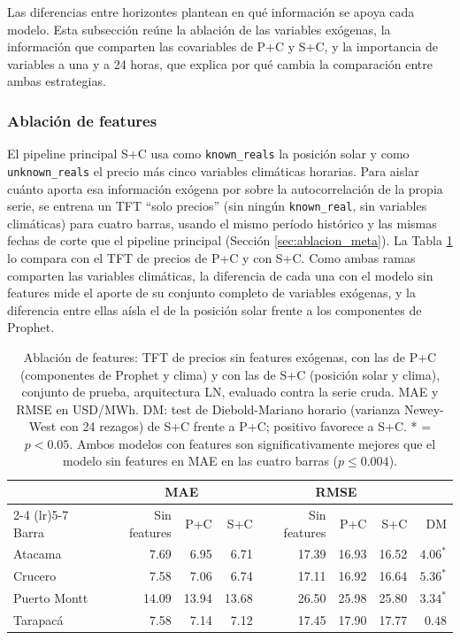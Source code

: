 Las diferencias entre horizontes plantean en qué información se apoya cada modelo. Esta subsección reúne la ablación de las variables exógenas, la información que comparten las covariables de P+C y S+C, y la importancia de variables a una y a 24 horas, que explica por qué cambia la comparación entre ambas estrategias.

\subsubsection{Ablación de features}
\label{sec:ablacion}

El pipeline principal S+C usa como \texttt{known\_reals} la posición solar y como \texttt{unknown\_reals} el precio más cinco variables climáticas horarias. Para aislar cuánto aporta esa información exógena por sobre la autocorrelación de la propia serie, se entrena un TFT ``solo precios'' (sin ningún \texttt{known\_real}, sin variables climáticas) para cuatro barras, usando el mismo período histórico y las mismas fechas de corte que el pipeline principal (Sección \ref{sec:ablacion_meta}). La Tabla \ref{tab:ablacion} lo compara con el TFT de precios de P+C y con S+C. Como ambas ramas comparten las variables climáticas, la diferencia de cada una con el modelo sin features mide el aporte de su conjunto completo de variables exógenas, y la diferencia entre ellas aísla el de la posición solar frente a los componentes de Prophet.

\begin{table}[htbp]
    \centering
    \small
    \begin{tabular}{lrrrrrrr}
        \toprule
        & \multicolumn{3}{c}{MAE} & \multicolumn{3}{c}{RMSE} & \\
        \cmidrule(lr){2-4} \cmidrule(lr){5-7}
        Barra & Sin features & P+C & S+C & Sin features & P+C & S+C & DM \\
        \midrule
        Atacama      & 7.69  & 6.95  & 6.71  & 17.39 & 16.93 & 16.52 & $4.06^*$ \\
        Crucero      & 7.58  & 7.06  & 6.74  & 17.11 & 16.92 & 16.64 & $5.36^*$ \\
        Puerto Montt & 14.09 & 13.94 & 13.68 & 26.50 & 25.98 & 25.80 & $3.34^*$ \\
        Tarapacá     & 7.58  & 7.14  & 7.12  & 17.45 & 17.90 & 17.77 & $0.48$ \\
        \bottomrule
    \end{tabular}
    \vspace{0.2cm}
    \caption{Ablación de features: TFT de precios sin features exógenas, con las de P+C (componentes de Prophet y clima) y con las de S+C (posición solar y clima), conjunto de prueba, arquitectura LN, evaluado contra la serie cruda. MAE y RMSE en USD/MWh. DM: test de Diebold-Mariano horario (varianza Newey-West con 24 rezagos) de S+C frente a P+C; positivo favorece a S+C. * = $p<0.05$. Ambos modelos con features son significativamente mejores que el modelo sin features en MAE en las cuatro barras ($p \leq 0.004$).}
    \label{tab:ablacion}
\end{table}

